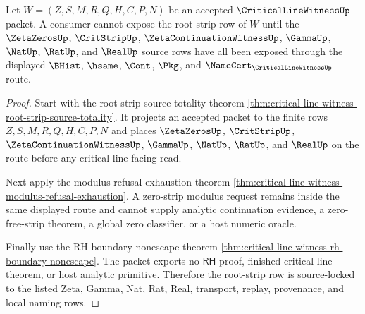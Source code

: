 \begin{theorem}
\label{thm:critical-line-witness-root-strip-zeta-gamma-source-lock}
Let $W=(Z,S,M,R,Q,H,C,P,N)$ be an accepted $\CriticalLineWitnessUp$ packet. A consumer cannot expose the root-strip row of $W$ until the $\ZetaZerosUp$, $\CritStripUp$, $\ZetaContinuationWitnessUp$, $\GammaUp$, $\NatUp$, $\RatUp$, and $\RealUp$ source rows have all been exposed through the displayed $\BHist$, $\hsame$, $\Cont$, $\Pkg$, and $\NameCert_{\CriticalLineWitnessUp}$ route.
\end{theorem}
\begin{proof}
Start with the root-strip source totality theorem \autoref{thm:critical-line-witness-root-strip-source-totality}. It projects an accepted packet to the finite rows $Z,S,M,R,Q,H,C,P,N$ and places $\ZetaZerosUp$, $\CritStripUp$, $\ZetaContinuationWitnessUp$, $\GammaUp$, $\NatUp$, $\RatUp$, and $\RealUp$ on the route before any critical-line-facing read.

Next apply the modulus refusal exhaustion theorem \autoref{thm:critical-line-witness-modulus-refusal-exhaustion}. A zero-strip modulus request remains inside the same displayed route and cannot supply analytic continuation evidence, a zero-free-strip theorem, a global zero classifier, or a host numeric oracle.

Finally use the RH-boundary nonescape theorem \autoref{thm:critical-line-witness-rh-boundary-nonescape}. The packet exports no $\mathsf{RH}$ proof, finished critical-line theorem, or host analytic primitive. Therefore the root-strip row is source-locked to the listed Zeta, Gamma, Nat, Rat, Real, transport, replay, provenance, and local naming rows.
\end{proof}

